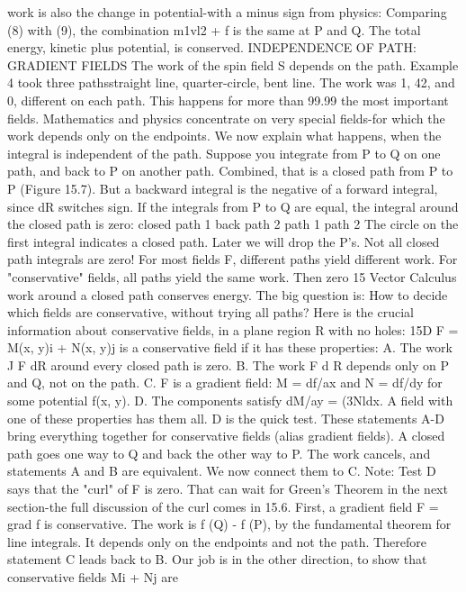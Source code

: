 work is also the change in potential-with a minus sign from physics:
Comparing (8) with (9), the combination m1vl2 + f is the same at P and Q. The total
energy, kinetic plus potential, is conserved.
INDEPENDENCE OF PATH: GRADIENT FIELDS
The work of the spin field S depends on the path. Example 4 took three pathsstraight
line, quarter-circle, bent line. The work was 1, 42, and 0, different on each
path. This happens for more than 99.99%
the most important fields. Mathematics and physics concentrate on very special
fields-for which the work depends only on the endpoints. We now explain what
happens, when the integral is independent of the path.
Suppose you integrate from P to Q on one path, and back to P on another path.
Combined, that is a closed path from P to P (Figure 15.7). But a backward integral
is the negative of a forward integral, since dR switches sign. If the integrals from P
to Q are equal, the integral around the closed path is zero:
closed path 1 back path 2 path 1 path 2
The circle on the first integral indicates a closed path. Later we will drop the P's.
Not all closed path integrals are zero! For most fields F, different paths yield
different work. For "conservative" fields, all paths yield the same work. Then zero 
15 Vector Calculus
work around a closed path conserves energy. The big question is: How to decide
which fields are conservative, without trying all paths? Here is the crucial information
about conservative fields, in a plane region R with no holes:
15D F = M(x, y)i + N(x, y)j is a conservative field if it has these properties:
A. The work J F dR around every closed path is zero.
B. The work F d R depends only on P and Q, not on the path.
C. F is a gradient field: M = df/ax and N = df/dy for some potential f(x, y).
D. The components satisfy dM/ay = (3Nldx.
A field with one of these properties has them all. D is the quick test.
These statements A-D bring everything together for conservative fields (alias gradient
fields). A closed path goes one way to Q and back the other way to P. The work
cancels, and statements A and B are equivalent. We now connect them to C. Note:
Test D says that the "curl" of F is zero. That can wait for Green's Theorem in the
next section-the full discussion of the curl comes in 15.6.
First, a gradient field F = grad f is conservative. The work is f (Q) - f (P), by the
fundamental theorem for line integrals. It depends only on the endpoints and not the
path. Therefore statement C leads back to B.
Our job is in the other direction, to show that conservative fields Mi + Nj are
